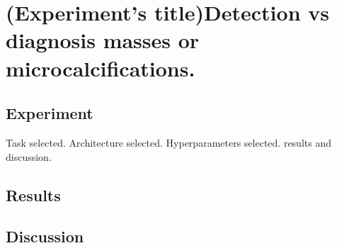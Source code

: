 \chapter{(Experiment's title)Detection vs diagnosis masses or microcalcifications.}
\label{ch:Experiment1}

\section{Experiment}
	Task selected. Architecture selected. Hyperparameters selected. results and discussion.

\section{Results}

\section{Discussion}
